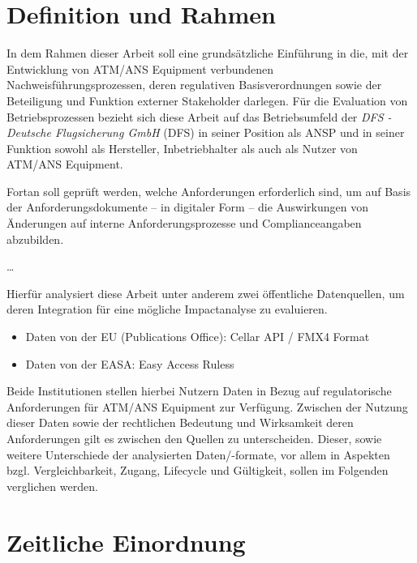         
    \pagebreak
    \section{Definition und Rahmen}

        In dem Rahmen dieser Arbeit soll eine grundsätzliche Einführung in die, mit der Entwicklung von ATM/ANS Equipment verbundenen Nachweisführungsprozessen, deren regulativen Basisverordnungen sowie der Beteiligung und Funktion externer Stakeholder darlegen.
        Für die Evaluation von Betriebsprozessen bezieht sich diese Arbeit auf das Betriebsumfeld der \textit{DFS - Deutsche Flugsicherung GmbH} (DFS) in seiner Position als ANSP und in seiner Funktion sowohl als Hersteller, Inbetriebhalter als auch als Nutzer von ATM/ANS Equipment.

        Fortan soll geprüft werden, welche Anforderungen erforderlich sind, um auf Basis der Anforderungsdokumente -- in digitaler Form -- die Auswirkungen von Änderungen auf interne Anforderungsprozesse und Complianceangaben abzubilden.

    \dots



        Hierfür analysiert diese Arbeit unter anderem zwei öffentliche Datenquellen, um deren Integration für eine mögliche Impactanalyse zu evaluieren.
        \begin{itemize}
            \item Daten von der EU (Publications Office): Cellar API / FMX4 Format
            \item Daten von der EASA: Easy Access Ruless
        \end{itemize}

        Beide Institutionen stellen hierbei Nutzern Daten in Bezug auf regulatorische Anforderungen für ATM/ANS Equipment zur Verfügung.
        Zwischen der Nutzung dieser Daten sowie der rechtlichen Bedeutung und Wirksamkeit deren Anforderungen gilt es zwischen den Quellen zu unterscheiden.
        Dieser, sowie weitere Unterschiede der analysierten Daten/-formate, vor allem in Aspekten bzgl. Vergleichbarkeit, Zugang, Lifecycle und Gültigkeit, sollen im Folgenden verglichen werden.

    
\section{Zeitliche Einordnung}


